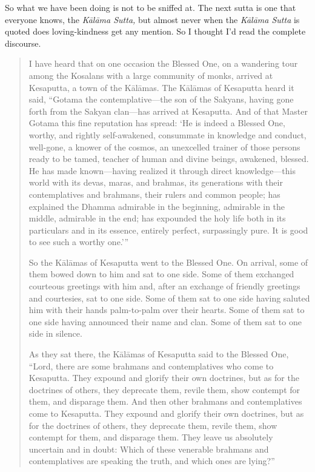 So what we have been doing is not to be sniffed at. The next sutta is
one that everyone knows, the \emph{Kālāma Sutta,} but almost never when
the \emph{Kālāma Sutta} is quoted does loving-kindness get any mention.
So I thought I’d read the complete discourse.

\begin{quotation}
I have heard that on one occasion the Blessed One, on a wandering tour
among the Kosalans with a large community of monks, arrived at
Kesaputta, a town of the Kālāmas. The Kālāmas of Kesaputta heard it
said, “Gotama the contemplative—the son of the Sakyans, having gone
forth from the Sakyan clan—has arrived at Kesaputta. And of that Master
Gotama this fine reputation has spread: ‘He is indeed a Blessed One,
worthy, and rightly self-awakened, consummate in knowledge and conduct,
well-gone, a knower of the cosmos, an unexcelled trainer of those
persons ready to be tamed, teacher of human and divine beings, awakened,
blessed. He has made known—having realized it through direct
knowledge—this world with its devas, maras, and brahmas, its generations
with their contemplatives and brahmans, their rulers and common people;
has explained the Dhamma admirable in the beginning, admirable in the
middle, admirable in the end; has expounded the holy life both in its
particulars and in its essence, entirely perfect, surpassingly pure. It
is good to see such a worthy one.’”

So the Kālāmas of Kesaputta went to the Blessed One. On arrival, some of
them bowed down to him and sat to one side. Some of them exchanged
courteous greetings with him and, after an exchange of friendly
greetings and courtesies, sat to one side. Some of them sat to one side
having saluted him with their hands palm-to-palm over their hearts. Some
of them sat to one side having announced their name and clan. Some of
them sat to one side in silence.

As they sat there, the Kālāmas of Kesaputta said to the Blessed One,
“Lord, there are some brahmans and contemplatives who come to Kesaputta.
They expound and glorify their own doctrines, but as for the doctrines
of others, they deprecate them, revile them, show contempt for them, and
disparage them. And then other brahmans and contemplatives come to
Kesaputta. They expound and glorify their own doctrines, but as for the
doctrines of others, they deprecate them, revile them, show contempt for
them, and disparage them. They leave us absolutely uncertain and in
doubt: Which of these venerable brahmans and contemplatives are speaking
the truth, and which ones are lying?”


\end{quotation}
